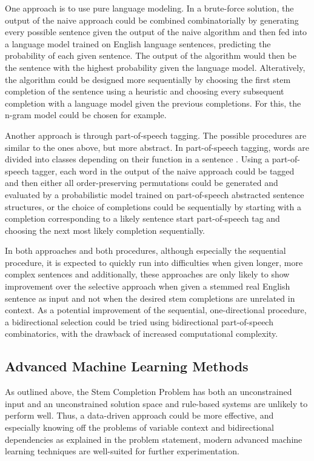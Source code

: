 \documentclass[11pt]{article}
\begin{document}
One approach is to use pure language modeling. In a brute-force solution, the output of the naive approach could be combined combinatorially by generating every possible sentence given the output of the naive algorithm and then fed into a language model trained on English language sentences, predicting the probability of each given sentence. The output of the algorithm would then be the sentence with the highest probability given the language model. Alteratively, the algorithm could be designed more sequentially by choosing the first stem completion of the sentence using a heuristic and choosing every subsequent completion with a language model given the previous completions. For this, the n-gram model could be chosen for example. 

Another approach is through part-of-speech tagging. The possible procedures are similar to the ones above, but more abstract. In part-of-speech tagging, words are divided into classes depending on their function in a sentence \citep{nlpbook}.
Using a part-of-speech tagger, each word in the output of the naive approach could be tagged and then either all order-preserving permutations could be generated and evaluated by a probabilistic model trained on part-of-speech abstracted sentence structures, or the choice of completions could be sequentially by starting with a completion corresponding to a likely sentence start part-of-speech tag and choosing the next most likely completion sequentially. 

In both approaches and both procedures, although especially the sequential procedure, it is expected to quickly run into difficulties when given longer, more complex sentences and additionally, these approaches are only likely to show improvement over the selective approach when given a stemmed real English sentence as input and not when the desired stem completions are unrelated in context. As a potential improvement of the sequential, one-directional procedure, a bidirectional selection could be tried using bidirectional part-of-speech combinatorics, with the drawback of increased computational complexity.


\subsection{Advanced Machine Learning Methods}

As outlined above, the Stem Completion Problem has both an unconstrained input and an unconstrained solution space and rule-based systems are unlikely to perform well. Thus, a data-driven approach could be more effective, and especially knowing off the problems of variable context and bidirectional dependencies as explained in the problem statement, modern advanced machine learning techniques are well-suited for further experimentation. 
\end{document}
